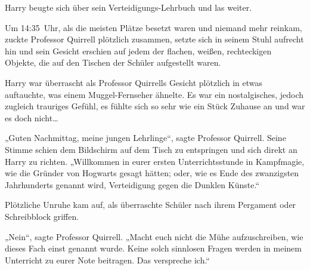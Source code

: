 Harry beugte sich über sein Verteidigungs-Lehrbuch und las weiter.

\later

Um 14:35~Uhr, als die meisten Plätze besetzt waren und niemand mehr reinkam, zuckte Professor Quirrell plötzlich zusammen, setzte sich in seinem Stuhl aufrecht hin und sein Gesicht erschien auf jedem der flachen, weißen, rechteckigen Objekte, die auf den Tischen der Schüler aufgestellt waren.

Harry war überrascht als Professor Quirrells Gesicht plötzlich in etwas auftauchte, was einem Muggel-Fernseher ähnelte. Es war ein nostalgisches, jedoch zugleich trauriges Gefühl, es fühlte sich so sehr wie ein Stück Zuhause an und war es doch nicht…

„Guten Nachmittag, meine jungen Lehrlinge“, sagte Professor Quirrell. Seine Stimme schien dem Bildschirm auf dem Tisch zu entspringen und sich direkt an Harry zu richten. „Willkommen in eurer ersten Unterrichtsstunde in Kampfmagie, wie die Gründer von Hogwarts gesagt hätten; oder, wie es Ende des zwanzigsten Jahrhunderts genannt wird, Verteidigung gegen die Dunklen Künste.“

Plötzliche Unruhe kam auf, als überraschte Schüler nach ihrem Pergament oder Schreibblock griffen.

„Nein“, sagte Professor Quirrell. „Macht euch nicht die Mühe aufzuschreiben, wie dieses Fach einst genannt wurde. Keine solch sinnlosen Fragen werden in meinem Unterricht zu eurer Note beitragen. Das verspreche ich.“

